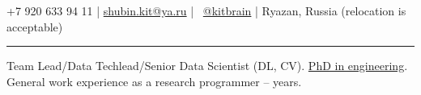 \documentclass[11pt]{article}
\newcounter{expyears}
\begin{document}
	
	\vspace{0.5em}

	\noindent +7 920 633 94 11 | \href{mailto:shubin.kit@ya.ru}{shubin.kit@ya.ru} | \faTelegram~\href{https://t.me/kitbrain}{@kitbrain} | Ryazan, Russia (relocation is acceptable)
	\vspace{0.5em}
	\hrule
	
	
	
	\vspace{1em}
	
	 Team Lead/Data Techlead/Senior Data Scientist (DL, CV). \href{https://disk.yandex.ru/i/ffl8gXNlYxGT8g}{PhD in engineering}. General work experience as a research programmer -- \theexpyears{} years.\\

	
\end{document}
